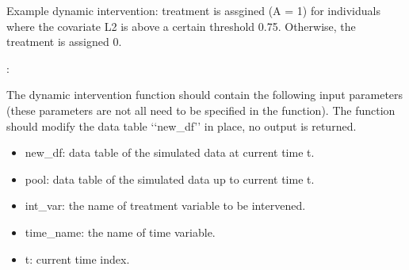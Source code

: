 \documentclass[letterpaper,10pt,english]{sphinxmanual}
\begin{document}
\sphinxAtStartPar
Example dynamic intervention: treatment is assgined (A = 1) for individuals where the covariate L2 is above a certain threshold 0.75.
Otherwise, the treatment is assigned 0.

\sphinxAtStartPar
{}:

\begin{sphinxVerbatim}[commandchars=\\\{\}]
       
    \PYG{p}{[}\PYG{p}{[}\PYG{p}{]}   \PYG{p}{]}  
    \PYG{p}{[}\PYG{p}{[}\PYG{p}{]}   \PYG{p}{]}  

  \PYG{p}{[}\PYG{p}{]}
  \PYG{p}{[}\PYG{p}{]}

     
                        \PYG{p}{[}\PYG{p}{]} 
\end{sphinxVerbatim}

\sphinxAtStartPar
The dynamic intervention function should contain the following input parameters (these parameters are not all need to be specified in the function).
The function should modify the data table ‘‘new\_df’’ in place, no output is returned.
\begin{itemize}
\item {} 
\sphinxAtStartPar
new\_df: data table of the simulated data at current time t.

\item {} 
\sphinxAtStartPar
pool: data table of the simulated data up to current time t.

\item {} 
\sphinxAtStartPar
int\_var: the name of treatment variable to be intervened.

\item {} 
\sphinxAtStartPar
time\_name: the name of time variable.

\item {} 
\sphinxAtStartPar
t: current time index.

\end{itemize}
\end{document}
